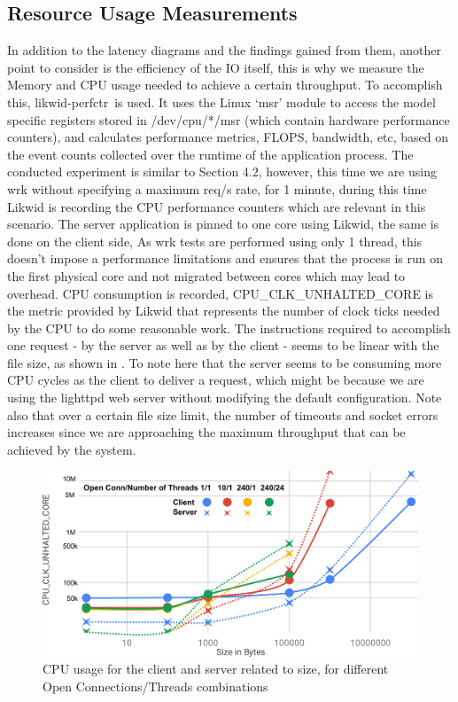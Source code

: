 \documentclass[runningheads]{llncs}
\begin{document}
\subsection{Resource Usage Measurements}
In addition to the latency diagrams and the findings gained from them, another point to consider is the efficiency of the IO itself, this is why we measure the Memory and CPU usage needed to achieve a certain throughput. To accomplish this, likwid-perfctr\,\cite{likwid} is used. It uses the Linux ‘msr’ module to access the model specific registers stored in /dev/cpu/*/msr (which contain hardware performance counters), and calculates performance metrics, FLOPS, bandwidth, etc, based on the event counts collected over the runtime of the application process.
The conducted experiment is similar to Section 4.2, however, this time we are using wrk\cite{wrkURL} without specifying a maximum req/s rate, for 1 minute, during this time Likwid is recording the CPU performance counters which are relevant in this scenario. The server application is pinned to one core using Likwid, the same is done on the client side, As wrk tests are performed using only 1 thread, this doesn’t impose a performance limitations and ensures that the process is run on the first physical core and not migrated between cores which may lead to overhead. 
CPU consumption is recorded, CPU\_CLK\_UNHALTED\_CORE is the metric provided by Likwid that represents the number of clock ticks needed by the CPU to do some reasonable work. The instructions required to accomplish one request - by the server as well as by the client - seems to be linear with the file size, as shown in . To note here that the server seems to be consuming more CPU cycles as the client to deliver a request, which might be because we are using the lighttpd web server without modifying the default configuration. Note also that over a certain file size limit, the number of timeouts and socket errors increases since we are approaching the maximum throughput that can be achieved by the system.
\begin{figure}
\includegraphics[width=\textwidth]{cuc-to-size.png}\vspace{-1em}
\caption{CPU usage for the client and server related to size, for different Open Connections/Threads combinations}\vspace{-1.5em}
\label{fig:cuc-to-size}
\end{figure}
\end{document}
